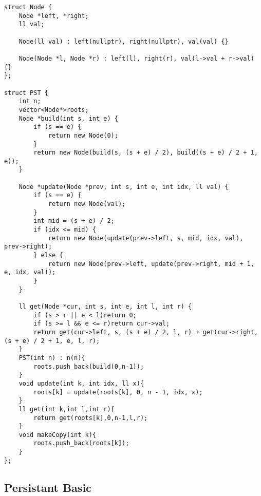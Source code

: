 \begin{lstlisting}[style=cpp]
struct Node {
    Node *left, *right;
    ll val;

    Node(ll val) : left(nullptr), right(nullptr), val(val) {}

    Node(Node *l, Node *r) : left(l), right(r), val(l->val + r->val) {}
};

struct PST {
    int n;
    vector<Node*>roots;
    Node *build(int s, int e) {
        if (s == e) {
            return new Node(0);
        }
        return new Node(build(s, (s + e) / 2), build((s + e) / 2 + 1, e));
    }

    Node *update(Node *prev, int s, int e, int idx, ll val) {
        if (s == e) {
            return new Node(val);
        }
        int mid = (s + e) / 2;
        if (idx <= mid) {
            return new Node(update(prev->left, s, mid, idx, val), prev->right);
        } else {
            return new Node(prev->left, update(prev->right, mid + 1, e, idx, val));
        }
    }

    ll get(Node *cur, int s, int e, int l, int r) {
        if (s > r || e < l)return 0;
        if (s >= l && e <= r)return cur->val;
        return get(cur->left, s, (s + e) / 2, l, r) + get(cur->right, (s + e) / 2 + 1, e, l, r);
    }
    PST(int n) : n(n){
        roots.push_back(build(0,n-1));
    }
    void update(int k, int idx, ll x){
        roots[k] = update(roots[k], 0, n - 1, idx, x);
    }
    ll get(int k,int l,int r){
        return get(roots[k],0,n-1,l,r);
    }
    void makeCopy(int k){
        roots.push_back(roots[k]);
    }
};
\end{lstlisting}

\subsection{Persistant Basic}

